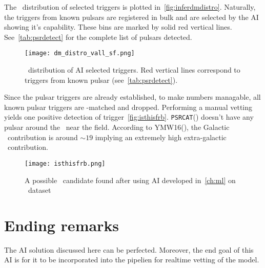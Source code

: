 \par The \dm~distribution of selected triggers is plotted in~\autoref{fig:inferdmdistro}. 
Naturally, the triggers from known pulsars are registered in bulk and are selected by the AI showing it's capability.
These bins are marked by solid red vertical lines. See~\autoref{tab:psrdetect} for the complete list of pulsars detected.

\begin{figure}
	\label{fig:inferdmdistro}
	\centering
	\texttt{[image: dm\_distro\_vall\_sf.png]}
	\caption{\dm~distribution of AI selected triggers. Red vertical lines correspond to triggers from known pulsar (see~\autoref{tab:psrdetect}).}
\end{figure}

\par Since the pulsar triggers are already established, to make numbers managable, all known pulsar triggers are \dm-matched and dropped.
Performing a manual vetting yields one positive detection of trigger~\autoref{fig:isthisfrb}.
\texttt{PSRCAT}(\cite{psrcat}) doesn't have any pulsar around the \dm~near the field.
According to YMW16(\cite{ymw16}), the Galactic \dm~contribution is around $\sim 19$ implying an extremely high extra-galactic \dm~contribution.

\begin{figure}
	\label{fig:isthisfrb}
	\centering
	\texttt{[image: isthisfrb.png]}
	\caption{A possible \frb~candidate found after using AI developed in~\autoref{ch:ml} on \vfps~dataset}
\end{figure}

\section{Ending remarks}

\par The AI solution discussed here can be perfected. Moreover, the end goal of this AI is for it to be incorporated into the \vf pipelien for realtime vetting of the model.

